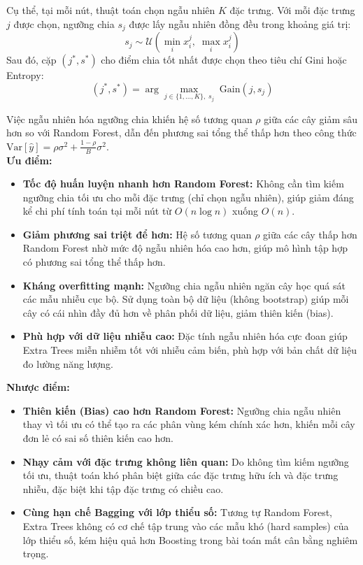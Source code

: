 Cụ thể, tại mỗi nút, thuật toán chọn ngẫu nhiên $K$ đặc trưng. Với mỗi đặc trưng $j$ được chọn, ngưỡng chia $s_j$ được lấy ngẫu nhiên đồng đều trong khoảng giá trị:
\begin{equation*}
    s_j \sim \mathcal{U}\left(\min_{i} x_i^j, \; \max_{i} x_i^j\right)
\end{equation*}
Sau đó, cặp $(j^*, s^*)$ cho điểm chia tốt nhất được chọn theo tiêu chí Gini hoặc Entropy:
\begin{equation*}
    (j^*, s^*) = \arg\max_{j \in \{1,\ldots,K\}, \; s_j} \; \text{Gain}(j, s_j)
\end{equation*}

Việc ngẫu nhiên hóa ngưỡng chia khiến hệ số tương quan $\rho$ giữa các cây giảm sâu hơn so với Random Forest, dẫn đến phương sai tổng thể thấp hơn theo công thức $\text{Var}[\hat{y}] = \rho \sigma^2 + \frac{1-\rho}{B}\sigma^2$.\\

\textbf{Ưu điểm:}
\begin{itemize}
    \item \textbf{Tốc độ huấn luyện nhanh hơn Random Forest:} Không cần tìm kiếm ngưỡng chia tối ưu cho mỗi đặc trưng (chỉ chọn ngẫu nhiên), giúp giảm đáng kể chi phí tính toán tại mỗi nút từ $O(n \log n)$ xuống $O(n)$.
    \item \textbf{Giảm phương sai triệt để hơn:} Hệ số tương quan $\rho$ giữa các cây thấp hơn Random Forest nhờ mức độ ngẫu nhiên hóa cao hơn, giúp mô hình tập hợp có phương sai tổng thể thấp hơn.
    \item \textbf{Kháng overfitting mạnh:} Ngưỡng chia ngẫu nhiên ngăn cây học quá sát các mẫu nhiễu cục bộ. Sử dụng toàn bộ dữ liệu (không bootstrap) giúp mỗi cây có cái nhìn đầy đủ hơn về phân phối dữ liệu, giảm thiên kiến (bias).
    \item \textbf{Phù hợp với dữ liệu nhiễu cao:} Đặc tính ngẫu nhiên hóa cực đoan giúp Extra Trees miễn nhiễm tốt với nhiễu cảm biến, phù hợp với bản chất dữ liệu đo lường năng lượng.
\end{itemize}

\textbf{Nhược điểm:}
\begin{itemize}
    \item \textbf{Thiên kiến (Bias) cao hơn Random Forest:} Ngưỡng chia ngẫu nhiên thay vì tối ưu có thể tạo ra các phân vùng kém chính xác hơn, khiến mỗi cây đơn lẻ có sai số thiên kiến cao hơn.
    \item \textbf{Nhạy cảm với đặc trưng không liên quan:} Do không tìm kiếm ngưỡng tối ưu, thuật toán khó phân biệt giữa các đặc trưng hữu ích và đặc trưng nhiễu, đặc biệt khi tập đặc trưng có chiều cao.
    \item \textbf{Cùng hạn chế Bagging với lớp thiểu số:} Tương tự Random Forest, Extra Trees không có cơ chế tập trung vào các mẫu khó (hard samples) của lớp thiểu số, kém hiệu quả hơn Boosting trong bài toán mất cân bằng nghiêm trọng.
\end{itemize}

